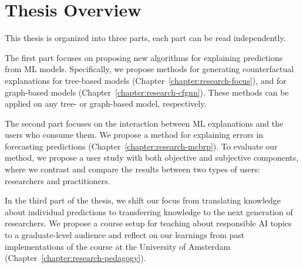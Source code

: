 
\section{Thesis Overview}
\label{section:introduction:overview}


\if
This thesis is organized into three parts, each part can be read independently. 

The first part focuses on proposing new algorithms for explaining predictions from ML models. 
Specifically, we propose methods for generating counterfactual explanations for tree-based models (Chapter~\ref{chapter:research-focus}), and for graph-based models (Chapter~\ref{chapter:research-cfgnn}). 
These methods can be applied on any tree- or graph-based model, respectively.

The second part focuses on the interaction between ML explanations and the users who consume them. 
We propose a method for explaining errors in forecasting predictions (Chapter~\ref{chapter:research-mcbrp}). 
To evaluate our method, we propose a user study with both objective and subjective components, where we contrast and compare the results between two types of users: researchers and practitioners. 


In the third part of the thesis, we shift our focus from translating knowledge about individual predictions to transferring knowledge to the next generation of researchers. 
We propose a course setup for teaching about responsible AI topics to a graduate-level audience and reflect on our learnings from past implementations of the course at the University of Amsterdam (Chapter~\ref{chapter:research-pedagogy}). 
\fi


